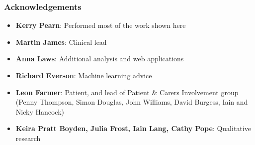 \begin{frame}
\frametitle{Acknowledgements}

\begin{itemize}
    \setlength{\itemsep}{4mm}
    \item \textbf{Kerry Pearn}: Performed most of the work shown here
    \item \textbf{Martin James}: Clinical lead
    \item \textbf{Anna Laws}: Additional analysis and web applications
    \item \textbf{Richard Everson}: Machine learning advice
    \item \textbf{Leon Farmer}: Patient, and lead of Patient \& Carers Involvement group (Penny Thompson, Simon Douglas, John Williams, David Burgess, Iain and Nicky Hancock)
    \item \textbf{Keira Pratt Boyden, Julia Frost, Iain Lang, Cathy Pope}: Qualitative research
\end{itemize}
\end{frame}